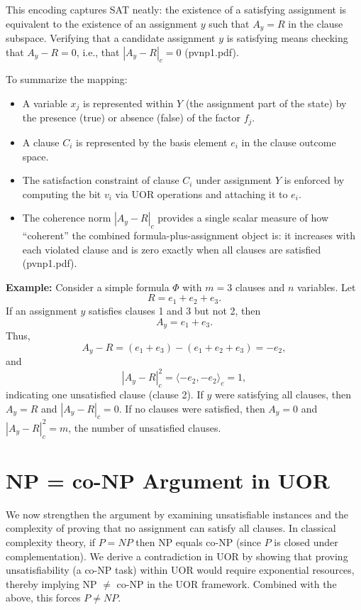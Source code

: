 \documentclass{article}
\begin{document}
This encoding captures SAT neatly: the existence of a satisfying assignment is equivalent to the existence of an assignment $y$ such that $A_y = R$ in the clause subspace. Verifying that a candidate assignment $y$ is satisfying means checking that $A_y - R = 0$, i.e., that $|A_y - R|_c = 0$ (pvnp1.pdf).

\medskip
To summarize the mapping:
\begin{itemize}
    \item A variable $x_j$ is represented within $Y$ (the assignment part of the state) by the presence (true) or absence (false) of the factor $f_j$.
    \item A clause $C_i$ is represented by the basis element $e_i$ in the clause outcome space.
    \item The satisfaction constraint of clause $C_i$ under assignment $Y$ is enforced by computing the bit $v_i$ via UOR operations and attaching it to $e_i$.
    \item The coherence norm $|A_y - R|_c$ provides a single scalar measure of how “coherent” the combined formula-plus-assignment object is: it increases with each violated clause and is zero exactly when all clauses are satisfied (pvnp1.pdf).
\end{itemize}

\medskip
\textbf{Example:} Consider a simple formula $\Phi$ with $m=3$ clauses and $n$ variables. Let 
\[
R = e_1 + e_2 + e_3.
\]
If an assignment $y$ satisfies clauses 1 and 3 but not 2, then
\[
A_y = e_1 + e_3.
\]
Thus,
\[
A_y - R = (e_1 + e_3) - (e_1+e_2+e_3) = -e_2,
\]
and 
\[
|A_y - R|_c^2 = \langle -e_2, -e_2 \rangle_c = 1,
\]
indicating one unsatisfied clause (clause 2). If $y$ were satisfying all clauses, then $A_y = R$ and $|A_y - R|_c = 0$. If no clauses were satisfied, then $A_y=0$ and $|A_y - R|_c^2 = m$, the number of unsatisfied clauses.

\section{NP = co-NP Argument in UOR}

We now strengthen the argument by examining unsatisfiable instances and the complexity of proving that no assignment can satisfy all clauses. In classical complexity theory, if $P=NP$ then NP equals co-NP (since $P$ is closed under complementation). We derive a contradiction in UOR by showing that proving unsatisfiability (a co-NP task) within UOR would require exponential resources, thereby implying NP $\neq$ co-NP in the UOR framework. Combined with the above, this forces $P \neq NP$.
\end{document}
